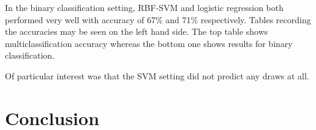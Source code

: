 \documentclass[paper=a4, fontsize=11pt]{scrartcl}
\numberwithin{equation}{section}		%
\numberwithin{figure}{section}			%
\numberwithin{table}{section}				%
\begin{document}
In the binary classification setting, RBF-SVM and logistic regression both performed very well with accuracy of 67\% and 71\% respectively. Tables recording the accuracies may be seen on the left hand side. The top table shows multiclassification accuracy whereas the bottom one shows results for binary classification.

Of particular interest was that the SVM setting did not predict any draws at all.

\section{Conclusion}

\end{document}
